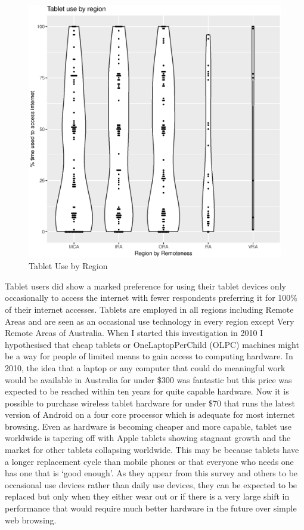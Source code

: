 \begin{figure}
\centering
\includegraphics[scale=0.5]{figures/VChart02-TabletByRegion.eps}
\caption{Tablet Use by Region} \label{fig:VC02TabletRegions}
\end{figure}
Tablet users did show a marked preference for using their tablet devices only occasionally to access the internet with fewer respondents preferring it for 100\% of their internet accesses. Tablets are employed in all regions including Remote Areas and are seen as an occasional use technology in every region except Very Remote Areas of Australia. 
When I started this investigation in 2010 I hypothesised that cheap tablets or OneLaptopPerChild (OLPC) machines might be a way for people of limited means to gain access to computing hardware. In 2010, the idea that a laptop or any computer that could do meaningful work would be available in Australia for under \$300 was fantastic but this price was expected to be reached within ten years for quite capable hardware. Now it is possible to purchase wireless tablet hardware for under \$70\cite{RefWorks:369} that runs the latest version of Android on a four core processor which is adequate for most internet browsing. 
Even as hardware is becoming cheaper and more capable, tablet use worldwide is tapering off with Apple tablets showing stagnant growth and the market for other tablets collapsing worldwide. \cite{RefWorks:425}%
This may be because tablets have a longer replacement cycle than mobile phones or that everyone who needs one has one that is `good enough'. As they appear from this survey and others to be occasional use devices rather than daily use devices, they can be expected to be replaced but only when they either wear out or if there is a very large shift in performance that would require much better hardware in the future over simple web browsing.

